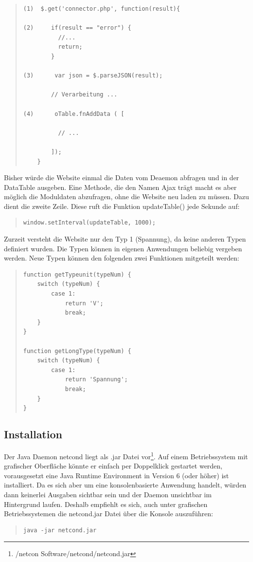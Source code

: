 \documentclass[a4paper,14pt,headsepline]{scrartcl}
\begin{document}
\begin{quote}
\begin{verbatim}
(1)  $.get('connector.php', function(result){

(2)     if(result == "error") { 
          //...
          return;
        }
    
(3)      var json = $.parseJSON(result);
    
        // Verarbeitung ...
    
(4)      oTable.fnAddData ( [
    
          // ... 
                
        ]);
    }
\end{verbatim}
\end{quote}  
Bisher würde die Website einmal die Daten vom Deaemon abfragen und in der DataTable ausgeben. Eine Methode, die den Namen Ajax trägt macht es aber möglich die Moduldaten abzufragen, ohne die Website neu laden zu müssen. Dazu dient die zweite Zeile. Diese ruft die Funktion updateTable() jede Sekunde auf:

\begin{quote}
\begin{verbatim}
window.setInterval(updateTable, 1000);
\end{verbatim}
\end{quote}  

Zurzeit versteht die Website nur den Typ 1 (Spannung), da keine anderen Typen definiert wurden. Die Typen können in eigenen Anwendungen beliebig vergeben werden. Neue Typen können den folgenden zwei Funktionen mitgeteilt werden: 

\begin{quote}
\begin{verbatim}
function getTypeunit(typeNum) {
    switch (typeNum) {
        case 1:
            return 'V';
            break;
    }
}

function getLongType(typeNum) {
    switch (typeNum) {
        case 1:
            return 'Spannung';
            break;
    }
}
\end{verbatim}
\end{quote}  
 
\newpage

\subsection{Installation}

Der Java Daemon netcond liegt als .jar Datei vor\footnote{/netcon Software/netcond/netcond.jar}. Auf einem Betriebssystem mit grafischer Oberfläche könnte er einfach per Doppelklick gestartet werden, vorausgesetzt eine Java Runtime Environment in Version 6 (oder höher) ist installiert. Da es sich aber um eine konsolenbasierte Anwendung handelt, würden dann keinerlei Ausgaben sichtbar sein und der Daemon unsichtbar im Hintergrund laufen. Deshalb empfiehlt es sich, auch unter grafischen Betriebssystemen die netcond.jar Datei über die Konsole auszuführen:
\begin{quote}
\begin{verbatim}
java -jar netcond.jar
\end{verbatim}
\end{quote}
\end{document}

